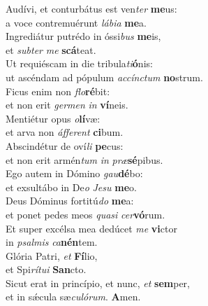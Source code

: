 \evenverse Audívi, et conturbátus est ven\textit{ter} \textbf{me}us:~\*\\
\evenverse a voce contremuérunt \textit{lá}\textit{bi}\textit{a} \textbf{me}a.\\
\oddverse Ingrediátur putrédo in óssi\textit{bus} \textbf{me}is,~\*\\
\oddverse et \textit{sub}\textit{ter} \textit{me} \textbf{scá}teat.\\
\evenverse Ut requiéscam in die tribula\textit{ti}\textbf{ó}nis:~\*\\
\evenverse ut ascéndam ad pópulum \textit{ac}\textit{cín}\textit{ctum} \textbf{no}strum.\\
\oddverse Ficus enim non \textit{flo}\textbf{ré}bit:~\*\\
\oddverse et non erit \textit{ger}\textit{men} \textit{in} \textbf{ví}neis.\\
\evenverse Mentiétur opus \textit{o}\textbf{lí}væ:~\*\\
\evenverse et arva non \textit{áf}\textit{fe}\textit{rent} \textbf{ci}bum.\\
\oddverse Abscindétur de oví\textit{li} \textbf{pe}cus:~\*\\
\oddverse et non erit armén\textit{tum} \textit{in} \textit{præ}\textbf{sé}pibus.\\
\evenverse Ego autem in Dómino \textit{gau}\textbf{dé}bo:~\*\\
\evenverse et exsultábo in De\textit{o} \textit{Je}\textit{su} \textbf{me}o.\\
\oddverse Deus Dóminus fortitú\textit{do} \textbf{me}a:~\*\\
\oddverse et ponet pedes meos \textit{qua}\textit{si} \textit{cer}\textbf{vó}rum.\\
\evenverse Et super excélsa mea dedúcet \textit{me} \textbf{vi}ctor~\*\\
\evenverse in \textit{psal}\textit{mis} \textit{ca}\textbf{nén}tem.\\
\oddverse Glória Patri, \textit{et} \textbf{Fí}lio,~\*\\
\oddverse et Spi\textit{rí}\textit{tu}\textit{i} \textbf{San}cto.\\
\evenverse Sicut erat in princípio, et nunc, \textit{et} \textbf{sem}per,~\*\\
\evenverse et in sǽcula sæ\textit{cu}\textit{ló}\textit{rum}. \textbf{A}men.\\

